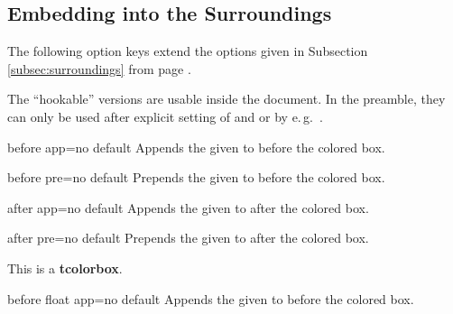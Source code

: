 \clearpage
\subsection{Embedding into the Surroundings}
The following option keys extend the options given in Subsection \ref{subsec:surroundings}
from page \pageref{subsec:surroundings}.

\begin{marker}
The \enquote{hookable} versions are usable inside the document.
In the preamble, they can only be used after explicit setting of
 and  or by e.\,g.\ .
\end{marker}

\begin{docTcbKey}{before app}{=}{no default}
  Appends the given  to  before the colored box.
\end{docTcbKey}

\begin{docTcbKey}{before pre}{=}{no default}
  Prepends the given  to  before the colored box.
\end{docTcbKey}

\begin{docTcbKey}{after app}{=}{no default}
  Appends the given  to  after the colored box.
\end{docTcbKey}

\begin{docTcbKey}{after pre}{=}{no default}
  Prepends the given  to  after the colored box.
\end{docTcbKey}

\begin{dispExample}

\begin{tcolorbox}[title=My title,before app={The box follows:\\[4pt]},
  after app={This is the end.}]
This is a \textbf{tcolorbox}.
\end{tcolorbox}
\end{dispExample}

\medskip

\begin{docTcbKey}{before float app}{=}{no default}
  Appends the given  to  before the colored box.
\end{docTcbKey}

